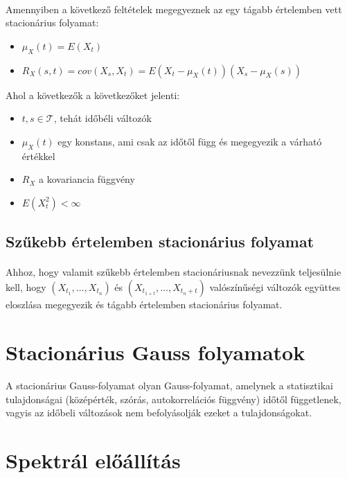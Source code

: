 \documentclass[11pt,a4pape,draftr]{article}
\begin{document}
					\paragraph{}
						Amennyiben a következő feltételek megegyeznek az egy tágabb értelemben vett stacionárius folyamat:
						\begin{itemize}
							\item $\mu_X (t) = E(X_t)$
							\item $R_X(s,t) = cov(X_s, X_t) = E(X_t - \mu_X (t)) (X_s - \mu_X (s))$
						\end{itemize}
						Ahol a következők a következőket jelenti:
						\begin{itemize}
							\item $t, s \in \mathcal{T}$, tehát időbéli változók
							\item $\mu_X (t)$ egy konstans, ami csak az időtől függ és megegyezik a várható értékkel
							\item $R_X$ a kovariancia függvény
							\item $E(X_t^2) < \infty$ 
						\end{itemize}
			\subsection{Szűkebb értelemben stacionárius folyamat}
				\paragraph{}

				Ahhoz, hogy valamit szűkebb értelemben stacionáriusnak nevezzünk teljesülnie kell, hogy $(X_{t_1}, \dots , X_{t_n})$ és $(X_{t_{1+t}}, \dots, X_{t_n + t})$ valószínűségi változók  együttes eloszlása megegyezik és tágabb értelemben stacionárius folyamat.

		\section{Stacionárius Gauss folyamatok}
			\paragraph{}
				A stacionárius Gauss-folyamat olyan Gauss-folyamat, amelynek a statisztikai tulajdonságai (középérték, szórás, autokorrelációs függvény) időtől függetlenek, vagyis az időbeli változások nem befolyásolják ezeket a tulajdonságokat.
		\section{Spektrál előállítás}
\end{document}
